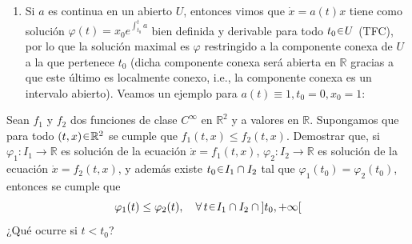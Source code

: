 \begin{sol}
\begin{enumerate}[label = (\alph*)]
\item 
Si $a$ es continua en un abierto $U$, entonces vimos que $\dot{x}=a(t)x$ tiene como solución $\varphi(t) = x_0e^{\scriptscriptstyle\int^t_{t_0}\!{\scriptstyle{a}}}$ bien definida y derivable para todo $t_0 \en U$ (TFC), por lo que la solución maximal es $\varphi$ restringido a la componente conexa de $U$ a la que pertenece $t_0$ (dicha componente conexa será abierta en $\mathbb{R}$ gracias a que este último es localmente conexo, i.e., la componente conexa es un intervalo abierto). Veamos un ejemplo para $a(t)\equiv 1, t_0=0,x_0=1$:

\end{enumerate}
\end{sol}



\begin{ejer}
Sean $f_1$ y $f_2$ dos funciones de clase $C^\infty$ en $\mathbb{R}^2$ y a valores en $\mathbb{R}$.
Supongamos que para todo $(t,x) \en \mathbb{R}^2$ se cumple que $f_1(t,x) \leq f_2(t,x)$.  
Demostrar que, si $\varphi_1 : I_1 \to \mathbb{R}$ es solución de la ecuación
$\dot{x} = f_1(t,x)$, $\varphi_2 : I_2 \to \mathbb{R}$ es solución de la ecuación
$\dot{x} = f_2(t,x)$, y además existe $t_0 \en I_1 \cap I_2$ tal que
$\varphi_1(t_0) = \varphi_2(t_0)$, entonces se cumple que
\[
    \varphi_1(t) \leq \varphi_2(t), \quad \forall \, t \en I_1 \cap I_2 \cap {]t_0, +\infty[}
\]
¿Qué ocurre si $t < t_0$?
\end{ejer}
